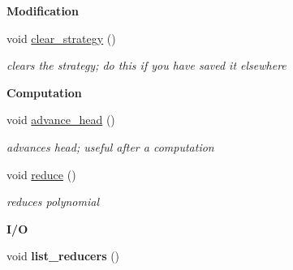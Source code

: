 \begin{Indent}\textbf{ Modification}\par
\begin{DoxyCompactItemize}
\item 
\mbox{\label{class_f4___reduction___data_ae58d3dee0209c8ad9d3cec0fad7fa9ee}} 
void \hyperlink{class_f4___reduction___data_ae58d3dee0209c8ad9d3cec0fad7fa9ee}{clear\+\_\+strategy} ()
\begin{DoxyCompactList}\small\item\em clears the strategy; do this if you have saved it elsewhere \end{DoxyCompactList}\end{DoxyCompactItemize}
\end{Indent}
\begin{Indent}\textbf{ Computation}\par
\begin{DoxyCompactItemize}
\item 
\mbox{\label{class_f4___reduction___data_a54e175677744480a92211f153ca089ae}} 
void \hyperlink{class_f4___reduction___data_a54e175677744480a92211f153ca089ae}{advance\+\_\+head} ()
\begin{DoxyCompactList}\small\item\em advances {\ttfamily head}; useful after a computation \end{DoxyCompactList}\item 
void \hyperlink{class_f4___reduction___data_a511ad15c3953fa8e137c726cd62afbf3}{reduce} ()
\begin{DoxyCompactList}\small\item\em reduces polynomial \end{DoxyCompactList}\end{DoxyCompactItemize}
\end{Indent}
\begin{Indent}\textbf{ I/O}\par
\begin{DoxyCompactItemize}
\item 
\mbox{\label{class_f4___reduction___data_af4491ffa78cb0e75051492b83f51744b}} 
void {\bfseries list\+\_\+reducers} ()
\end{DoxyCompactItemize}
\end{Indent}

